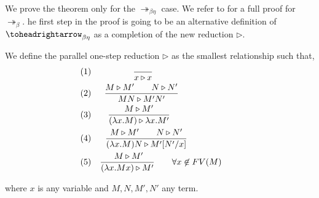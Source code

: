 We prove the theorem only for the $ \twoheadrightarrow_{\beta\eta}$ case. We refer to  \cite[Theorem 1.32]{hindley2008lambda} for a full proof for $\twoheadrightarrow_\beta$. he first step in the proof is going to be an alternative definition of $\toheadrightarrow_{\beta\eta}$ as a completion of the new reduction $\triangleright$.
\begin{definition}
  We define the parallel one-step reduction  $\triangleright$ as the smallest relationship such that,\\
  \begin{align*}
    (1)&& {\displaystyle \over x \triangleright x}\qquad\qquad\qquad\qquad\qquad\\
    (2)&& { M \triangleright M'\qquad N\triangleright N'  \over MN \triangleright M'N' }\qquad\qquad\qquad\ \  \ \\
    (3)&&{M \triangleright M' \over(\lambda x.M) \triangleright \lambda x.M'}\qquad\qquad\qquad\qquad\\
    (4)&& {M \triangleright M'\qquad N \triangleright N' \over (\lambda x.M)N \triangleright M'[N'/x]}\qquad\qquad\qquad\\
    (5)&& {\ M\triangleright M'\over(\lambda x.Mx) \triangleright M'} \qquad \forall x \not  \in FV(M)\qquad
  \end{align*}



  where $x$ is any variable and $M,N,M',N'$ any term.
\end{definition}

